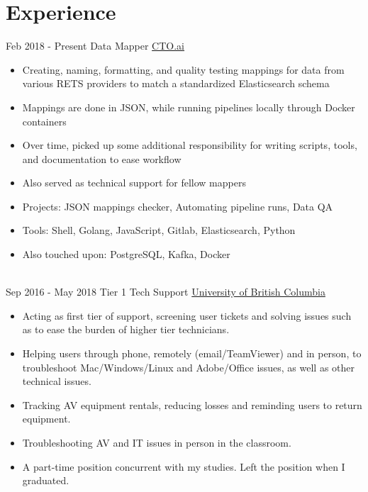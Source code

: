 \documentclass[letterpaper]{twentysecondcv} %
\begin{document}
\makeprofile %


\section{Experience}

\begin{twenty} %
\twentyitem
    	{Feb 2018 -}
		{Present}
        {Data Mapper}
        {\href{http://cto.ai/}{CTO.ai}}
        {}
        {\begin{itemize}
        \item Creating, naming, formatting, and quality testing mappings for data from various RETS providers to match a standardized Elasticsearch schema
        \item Mappings are done in JSON, while running pipelines locally through Docker containers
        \item Over time, picked up some additional responsibility for writing scripts, tools, and documentation to ease workflow
        \item Also served as technical support for fellow mappers
        \item Projects: JSON mappings checker, Automating pipeline runs, Data QA
        \item Tools: Shell, Golang, JavaScript, Gitlab, Elasticsearch, Python
        \item Also touched upon: PostgreSQL, Kafka, Docker
        \end{itemize}}
        \\
	\twentyitem
    	{Sep 2016 -}
		{May 2018}
        {Tier 1 Tech Support}
        {\href{http://ubc.ca/}{University of British Columbia}}
        {}
        {
        {\begin{itemize}
        \item Acting as first tier of support, screening user tickets and solving issues such as to ease the burden of higher tier technicians.
        \item Helping users through phone, remotely (email/TeamViewer) and in person, to troubleshoot Mac/Windows/Linux and Adobe/Office issues, as well as other technical issues.
        \item Tracking AV equipment rentals, reducing losses and reminding users to return equipment.
        \item Troubleshooting AV and IT issues in person in the classroom.
        \item A part-time position concurrent with my studies. Left the position when I graduated.
    \end{itemize}}
        }
    \\   
        
\end{twenty}
\end{document}
